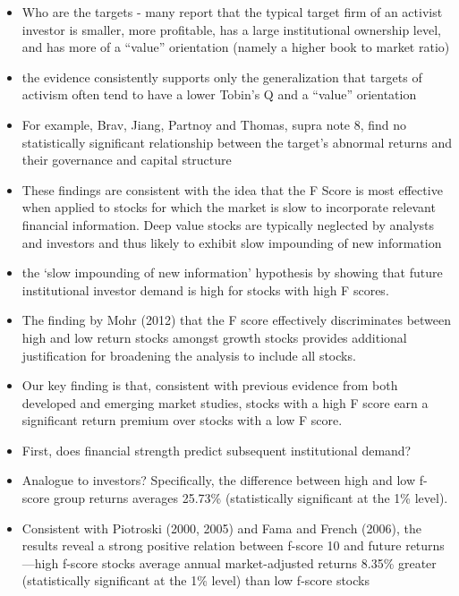 \documentclass[12pt]{article}
\begin{document}
    \begin{itemize}
        \item Who are the targets - many report that the typical target firm of an activist investor is smaller, more profitable, has a large institutional ownership level, and has more of a “value” orientation (namely a higher book to market ratio) \citep{CoffeeJr.2014}

        \item the evidence consistently supports only the generalization that targets of activism often tend to have a lower Tobin’s Q and a “value” orientation \citep{CoffeeJr.2014}
        \item For example, Brav, Jiang, Partnoy and Thomas, supra note 8, find no statistically significant relationship between the target’s abnormal returns and their governance and capital structure \citep{CoffeeJr.2014}
        \item These findings are consistent with the idea that the F Score is most effective when applied to stocks for which the market is slow to incorporate relevant financial information. Deep value stocks are typically neglected by analysts and investors and thus likely to exhibit slow impounding of new information \citep{Hyde2014}
        \item the ‘slow impounding of new information’ hypothesis by showing that future institutional investor demand is high for stocks with high F scores. \citep{Hyde2014}
        \item The finding by Mohr (2012) that the F score effectively discriminates between high and low return stocks amongst growth stocks provides additional justification for broadening the analysis to include all stocks. \citep{Hyde2014}
        \item Our key finding is that, consistent with previous evidence from both developed and emerging market studies, stocks with a high F score earn a significant return premium over stocks with a low F score.\citep{Hyde2014}
        \item First, does financial strength predict subsequent institutional demand? \citep{Choi2012}
        \item Analogue to investors? Specifically, the difference between high and low f-score group returns averages 25.73\% (statistically significant at the 1\% level). \citep{Choi2012}
        \item Consistent with Piotroski (2000, 2005) and Fama and French (2006), the results reveal a strong positive relation between f-score 10 and future returns—high f-score stocks average annual market-adjusted returns 8.35\% greater (statistically significant at the 1\% level) than low f-score stocks \citep{Choi2012} 

    \end{itemize}
\end{document}
